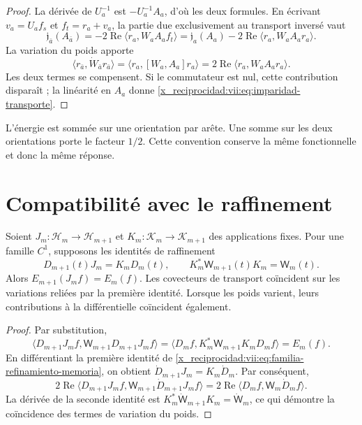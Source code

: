 \begin{proof}
La dérivée de \(U_a^{-1}\) est \(-U_a^{-1}A_a\), d'où les deux formules. En écrivant \(v_a=U_af_s\) et \(f_t=r_a+v_a\), la partie due exclusivement au transport inversé vaut
\[
 \mathfrak j_{\bar a}(A_{\bar a})
 =-2\operatorname{Re}\langle r_a,W_aA_af_t\rangle
 =\mathfrak j_a(A_a)
   -2\operatorname{Re}\langle r_a,W_aA_ar_a\rangle.
\]
La variation du poids apporte
\[
 \langle r_{\bar a},\dot W_{\bar a}r_{\bar a}\rangle
 =\langle r_a,[W_a,A_a]r_a\rangle
 =2\operatorname{Re}\langle r_a,W_aA_ar_a\rangle.
\]
Les deux termes se compensent. Si le commutateur est nul, cette contribution
disparaît ; la linéarité en \(A_a\) donne
\eqref{x_reciprocidad:vii:eq:imparidad-transporte}.
\end{proof}

L'énergie est sommée sur une orientation par arête. Une somme sur les deux
orientations porte le facteur \(1/2\). Cette convention conserve la même
fonctionnelle et donc la même réponse.

\section{Compatibilité avec le raffinement}
\label{x_reciprocidad:vii:subsec:refinamiento-respuesta}

\begin{theorem}
\label{x_reciprocidad:vii:thm:refinamiento-respuesta}
Soient \(J_m:\mathcal H_m\to\mathcal H_{m+1}\) et
\(K_m:\mathcal K_m\to\mathcal K_{m+1}\) des applications fixes.
Pour une famille \(C^1\), supposons les identités de raffinement
\begin{equation}
 D_{m+1}(t)J_m=K_mD_m(t),\qquad
 K_m^*\mathsf W_{m+1}(t)K_m=\mathsf W_m(t).
 \label{x_reciprocidad:vii:eq:familia-refinamiento-memoria}
\end{equation}
Alors \(E_{m+1}(J_mf)=E_m(f)\). Les covecteurs de transport coïncident sur les variations reliées par la première identité. Lorsque les poids varient, leurs contributions à la différentielle coïncident également.
\end{theorem}

\begin{proof}
Par substitution,
\[
 \langle D_{m+1}J_mf,\mathsf W_{m+1}D_{m+1}J_mf\rangle
 =\langle D_mf,K_m^*\mathsf W_{m+1}K_mD_mf\rangle=E_m(f).
\]
En différentiant la première identité de
\eqref{x_reciprocidad:vii:eq:familia-refinamiento-memoria}, on obtient
\(\dot D_{m+1}J_m=K_m\dot D_m\). Par conséquent,
\[
 2\operatorname{Re}
 \langle D_{m+1}J_mf,\mathsf W_{m+1}\dot D_{m+1}J_mf\rangle
 =2\operatorname{Re}\langle D_mf,\mathsf W_m\dot D_mf\rangle.
\]
La dérivée de la seconde identité est
\(K_m^*\dot{\mathsf W}_{m+1}K_m=\dot{\mathsf W}_m\), ce qui démontre
la coïncidence des termes de variation du poids.
\end{proof}

